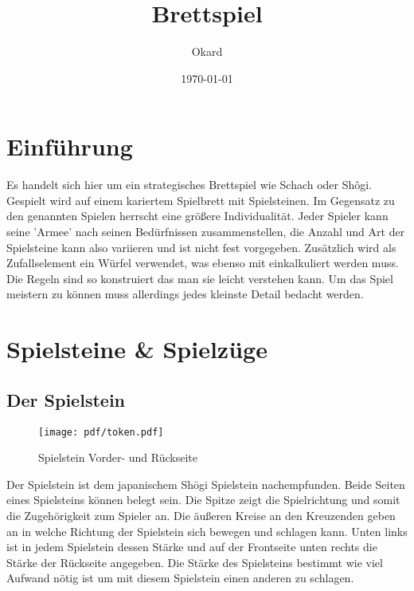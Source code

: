 \documentclass{article}
\title{Brettspiel}
\author{Okard}
\date{\today}
\begin{document}
\maketitle
\tableofcontents
\newpage

\section{Einführung}
	Es handelt sich hier um ein strategisches Brettspiel wie Schach oder Shôgi.
	Gespielt wird auf einem kariertem Spielbrett mit Spielsteinen.
	Im Gegensatz zu den genannten Spielen herrscht eine größere Individualität.
	Jeder Spieler kann seine 'Armee' nach seinen Bedürfnissen zusammenstellen, die
	Anzahl und Art der Spielsteine kann also variieren und ist nicht fest vorgegeben.
	Zusätzlich wird als Zufallselement ein Würfel verwendet, was ebenso mit einkalkuliert 
	werden muss.
	Die Regeln sind so konstruiert das man sie leicht verstehen kann. Um das Spiel meistern
	zu können muss allerdings jedes kleinste Detail bedacht werden.
	
	
	


\section{Spielsteine \& Spielzüge}

\subsection{Der Spielstein}
		
	\begin{wrapfigure}{l}{5cm}
	\centering
	\texttt{[image: pdf/token.pdf]}
	\caption{Spielstein Vorder- und Rückseite}
	\end{wrapfigure}
	
	Der Spielstein ist dem japanischem Sh\=ogi Spielstein nachempfunden. Beide Seiten eines Spielsteins können belegt sein.
	Die Spitze zeigt die Spielrichtung und somit die Zugehörigkeit zum Spieler an.
	Die äußeren Kreise an den Kreuzenden geben an in welche Richtung der Spielstein sich bewegen und schlagen kann.
	Unten links ist in jedem Spielstein dessen Stärke und auf der Frontseite unten rechts die Stärke der Rückseite angegeben.
	Die Stärke des Spielsteins bestimmt wie viel Aufwand nötig ist um mit diesem Spielstein einen anderen zu schlagen.
	\\
\end{document}
